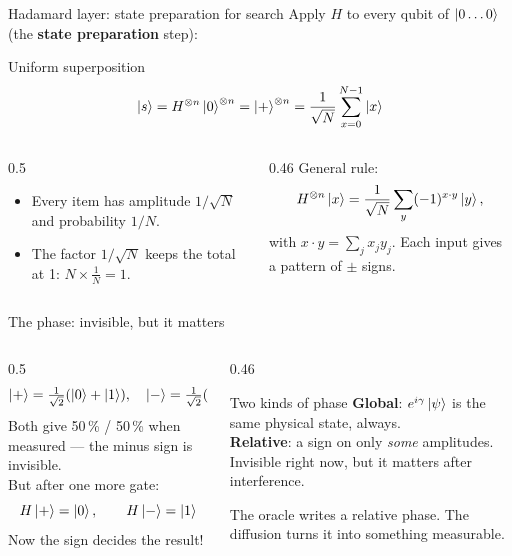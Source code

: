 \documentclass[aspectratio=169,11pt]{beamer}
\newcommand{\key}[1]{{\color{qdark}\textbf{#1}}}
\begin{document}
\begin{frame}{Hadamard layer: state preparation for search}
  Apply $H$ to every qubit of $\ket{0\dots0}$ (the \key{state preparation} step):
  \begin{block}{Uniform superposition}
    \[ \ket{s} = H^{\otimes n}\ket{0}^{\otimes n} = \ket{+}^{\otimes n} = \frac{1}{\sqrt N}\sum_{x=0}^{N-1}\ket{x} \]
  \end{block}
  \begin{columns}[T]
    \begin{column}{0.5\textwidth}
      \begin{itemize}
        \item Every item has amplitude $1/\sqrt N$ and probability $1/N$.
        \item The factor $1/\sqrt N$ keeps the total at 1: $N\times\frac1N = 1$.
      \end{itemize}
    \end{column}
    \begin{column}{0.46\textwidth}
      \small General rule:
      \[ H^{\otimes n}\ket{x} = \frac{1}{\sqrt N}\sum_y(-1)^{x\cdot y}\ket{y}, \]
      with $x\cdot y = \sum_jx_jy_j$. Each input gives a pattern of $\pm$ signs.
    \end{column}
  \end{columns}
\end{frame}

\begin{frame}{The phase: invisible, but it matters}
  \begin{columns}[T]
    \begin{column}{0.5\textwidth}
      \[ \ket{+} = \tfrac{1}{\sqrt2}(\ket{0} + \ket{1}), \quad \ket{-} = \tfrac{1}{\sqrt2}(\ket{0} - \ket{1}) \]
      Both give 50\,\% / 50\,\% when measured --- the minus sign is invisible.\\[2mm]
      But after one more gate:
      \[ H\ket{+} = \ket{0}, \qquad H\ket{-} = \ket{1} \]
      Now the sign decides the result!
    \end{column}
    \begin{column}{0.46\textwidth}
      \begin{block}{Two kinds of phase}
        \key{Global}: $e^{i\gamma}\ket\psi$ is the same physical state, always.\\[1mm]
        \key{Relative}: a sign on only \emph{some} amplitudes. Invisible right now, but it matters after interference.
      \end{block}
      \small The oracle writes a relative phase. The diffusion turns it into something measurable.
    \end{column}
  \end{columns}
\end{frame}
\end{document}
